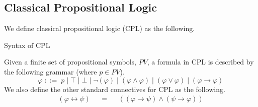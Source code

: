 \documentclass{llncs}
\begin{document}
\subsection{Classical Propositional Logic}
%
We define classical propositional logic (CPL) as the following.
%
\begin{definition}{Syntax of CPL}\label{Syntax of CPL}

Given a finite set of propositional symbols, $PV$, a formula in CPL is
described by the following grammar (where $p \in PV$).
%
\begin{equation*}
\varphi \; ::= \; p \; \vert \; \top \; \vert \; \bot \; \vert \; \neg
(\varphi) \; \vert \; (\varphi \wedge \varphi) \; \vert \; (\varphi \vee
\varphi) \; \vert \; (\varphi \rightarrow \varphi)
\end{equation*}
%
We also define the other standard connectives for CPL as the following.
%
$$
\begin{array}{rlcll}
(\varphi \leftrightarrow \psi) &&=&& ((\varphi \rightarrow \psi) \wedge (\psi
\rightarrow \varphi)) \\
\end{array}
$$
%
\end{definition}
\end{document}
